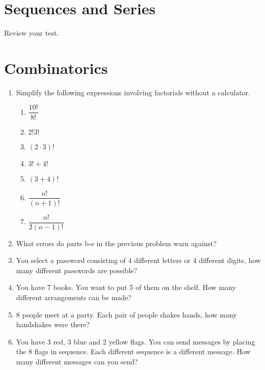 \documentclass[12pt]{article}
\theoremstyle{plain}     %
\begin{document}
\section{Sequences and Series}
Review your test.
\newpage


\section{Combinatorics}
\begin{enumerate}
	\item Simplify the following expressions involving factorials without a calculator.
		\begin{multicols}{2}
		\begin{enumerate}
			\item $\dfrac{10!}{8!}$\\
			\item $2!3!$\\
			\item $(2\cdot 3)!$\\
			\item $3!+4!$\\
			\item $(3+4)!$\\
			\item $\dfrac{n!}{(n+1)!}$\\
			\item $\dfrac{n!}{2(n-1)!}$\\
		\end{enumerate}
		\end{multicols}
		\item What errors do parts b-e in the previous problem warn against?
		\item You select a password consisting of 4 different letters or 4 different digits, how many different passwords are possible?\\
		\item You have 7 books. You want to put 5 of them on the shelf. How many different arrangements can be made?
		\item 8 people meet at a party. Each pair of people shakes hands, how many handshakes were there?
		\item You have 3 red, 3 blue and 2 yellow flags. You can send messages by placing the 8 flags in sequence. Each different sequence is a different message. How many different messages can you send?
\end{enumerate}
\end{document}
